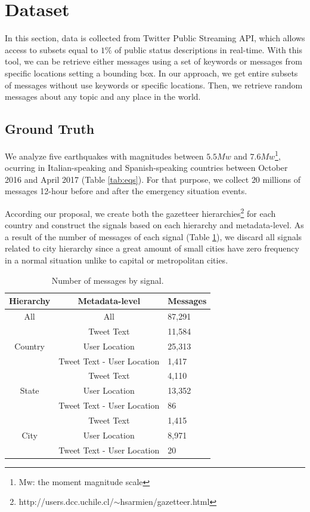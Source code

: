\documentclass[sigconf]{acmart}
\begin{document}
\section{Dataset}

In this section, data is collected from Twitter Public Streaming API, which allows access to subsets equal to $1\%$ of public status descriptions in real-time. With this tool, we can be retrieve either messages using a set of keywords or messages from specific locations setting a bounding box. In our approach, we get entire subsets of messages without use keywords or specific locations. Then, we retrieve random messages about any topic and any place in the world.
 
\subsection{Ground Truth}

We analyze five earthquakes with magnitudes between $5.5Mw$ and $7.6Mw$\footnote{Mw: the moment magnitude scale}, ocurring in Italian-speaking and Spanish-speaking countries between October 2016 and April 2017 (Table \ref{tab:eqs}). For that purpose, we collect $20$ millions of messages 12-hour before and after the emergency situation events. 

According our proposal, we create both the gazetteer hierarchies\footnote{http://users.dcc.uchile.cl/$\sim$hsarmien/gazetteer.html} for each country and construct the signals based on each hierarchy and metadata-level. As a result of the number of messages of each signal (Table \ref{tab:message_signal}), we discard all signals related to city hierarchy since a great amount of small cities have zero frequency in a normal situation unlike to capital or metropolitan cities.




\begin{table}
	\caption{Number of messages by signal.}
	\label{tab:message_signal}
	\begin{tabular}{ccl}
		\toprule
		Hierarchy&Metadata-level&Messages\\
		\midrule
		All & All & 87,291 \\
		\midrule
	    \multirow{3}{*}{Country} & Tweet Text & 11,584 \\
	    & User Location & 25,313\\
	    & Tweet Text - User Location & 1,417\\	
		\bottomrule
		\multirow{3}{*}{State} & Tweet Text & 4,110 \\
		& User Location & 13,352\\
		& Tweet Text - User Location & 86\\
		\midrule
		\multirow{3}{*}{City} & Tweet Text & 1,415 \\
		& User Location & 8,971\\
		& Tweet Text - User Location & 20\\
		\bottomrule
	\end{tabular}
\end{table} 
\end{document}
